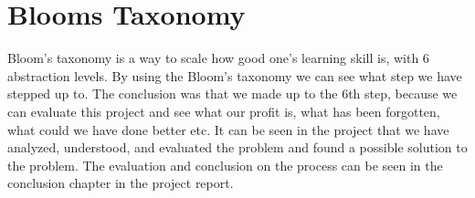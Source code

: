 \section{Blooms Taxonomy}
Bloom's taxonomy is a way to scale how good one's learning skill is, with 6 abstraction levels.
By using the Bloom's taxonomy we can see what step we have stepped up to. The conclusion was that we made up to the 6th step, because we can evaluate this project and see what our profit is, what has been forgotten, what could we have done better etc. It can be seen in the project that we have analyzed, understood, and evaluated the problem and found a possible solution to the problem. The evaluation and conclusion on the process can be seen in the conclusion chapter in the project report.